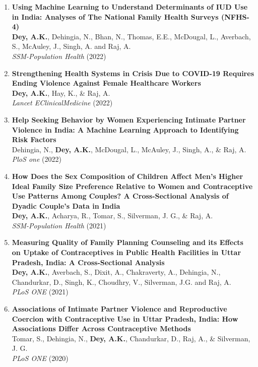 \documentclass[11pt,letterpaper]{article}
\begin{document}
\begin{enumerate}
\item \textbf{Using Machine Learning to Understand Determinants of IUD Use in India: Analyses of The National Family Health Surveys (NFHS-4)}\\
\textbf{Dey, A.K.}, Dehingia, N., Bhan, N., Thomas, E.E., McDougal, L., Averbach, S., McAuley, J., Singh, A. and Raj, A.\\
\emph{SSM-Population Health} (2022) 

\item \textbf{Strengthening Health Systems in Crisis Due to COVID-19 Requires Ending Violence Against Female Healthcare Workers}\\
\textbf{Dey, A.K.}, Hay, K., \& Raj, A.\\
\emph{Lancet EClinicalMedicine} (2022) 

\item \textbf{Help Seeking Behavior by Women Experiencing Intimate Partner Violence in India: A Machine Learning Approach to Identifying Risk Factors}\\
Dehingia, N., \textbf{Dey, A.K.}, McDougal, L., McAuley, J., Singh, A., \& Raj, A.\\
\emph{PloS one} (2022)   

\item \textbf{How Does the Sex Composition of Children Affect Men's Higher Ideal Family Size Preference Relative to Women and Contraceptive Use Patterns Among Couples? A Cross-Sectional Analysis of Dyadic Couple's Data in India}\\
\textbf{Dey, A.K.}, Acharya, R., Tomar, S., Silverman, J. G., \& Raj, A.\\
\emph{SSM-Population Health} (2021) 

\item \textbf{Measuring Quality of Family Planning Counseling and its Effects on Uptake of Contraceptives in Public Health Facilities in Uttar Pradesh, India: A Cross-Sectional Analysis}\\
\textbf{Dey, A.K.}, Averbach, S., Dixit, A., Chakraverty, A., Dehingia, N., Chandurkar, D., Singh, K., Choudhry, V., Silverman, J.G. and Raj, A.\\
\emph{PLoS ONE} (2021)  

\item \textbf{Associations of Intimate Partner Violence and Reproductive Coercion with Contraceptive Use in Uttar Pradesh, India: How Associations Differ Across Contraceptive Methods}\\
Tomar, S., Dehingia, N., \textbf{Dey, A.K.}, Chandurkar, D., Raj, A., \& Silverman, J. G.\\
\emph{PLoS ONE} (2020) 


\end{enumerate}
\end{document}
